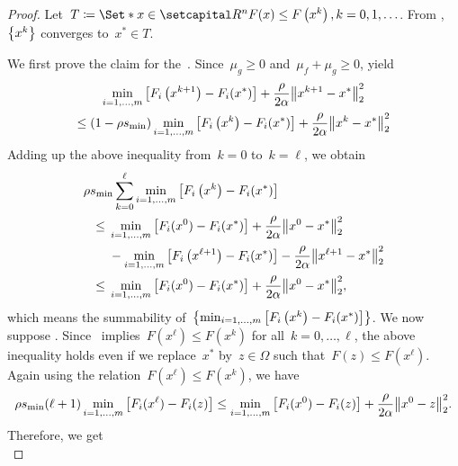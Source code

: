 \documentclass[../../main]{subfiles}
\begin{document}
\begin{proof}
    Let~$T \coloneqq \Set*{x \in \setR^n}{F(x) \le F\left(x^k\right), k = 0, 1, \dots}$.
    From ,~$\set*{x^k}$ converges to~$x^* \in T$.

    We first prove the claim for the~.
    Since~$\mu_g \ge 0$ and~$\mu_f + \mu_g \ge 0$,  yield
    \begin{multline}
        \min_{i = 1, \dots, m} \left[F_i\left(x^{k + 1}\right) - F_i(x^*)\right] + \frac{\rho}{2 \alpha} \norm*{x^{k + 1} - x^*}_2^2 \\
        \le \left(1 - \rho s_{\min}\right) \min_{i = 1, \dots, m} \left[F_i\left(x^k\right) - F_i(x^*)\right] + \frac{\rho}{2 \alpha} \norm*{x^k - x^*}_2^2
    \end{multline}
    Adding up the above inequality from~$k = 0$ to~$k = \ell$, we obtain
    \begin{align}
        \MoveEqLeft \rho s_{\min} \sum_{k = 0}^{\ell} \min_{i = 1, \dots, m} \left[F_i\left(x^k\right) - F_i(x^*)\right] \\
        \le{}& \min_{i = 1, \dots, m} \left[F_i(x^0) - F_i(x^*)\right] + \frac{\rho}{2 \alpha} \norm*{x^0 - x^*}_2^2 \\
             &- \min_{i = 1, \dots, m} \left[F_i\left(x^{\ell + 1}\right) - F_i(x^*)\right] - \frac{\rho}{2 \alpha} \norm*{x^{\ell + 1} - x^*}_2^2 \\
        \le{}& \min_{i = 1, \dots, m} \left[F_i(x^0) - F_i(x^*)\right] + \frac{\rho}{2 \alpha} \norm*{x^0 - x^*}_2^2
    ,\end{align}
    which means the summability of~$\set*{\min_{i = 1, \dots, m} \left[F_i\left(x^k\right) - F_i(x^*)\right]}$.
    We now suppose .
    Since~ implies~$F\left(x^\ell\right) \le F\left(x^k\right)$ for all~$k = 0, \dots, \ell$, the above inequality holds even if we replace~$x^*$ by~$z \in \Omega$ such that~$F(z) \le F\left(x^\ell\right)$.
    Again using the relation~$F\left(x^\ell\right) \le F\left(x^k\right)$, we have
    \begin{multline}
        \rho s_{\min} (\ell + 1) \min_{i = 1, \dots, m} \left[ F_i(x^\ell) - F_i(z) \right] \le \min_{i = 1, \dots, m} \left[F_i(x^0) - F_i(z)\right] + \frac{\rho}{2 \alpha} \norm*{x^0 - z}_2^2
    .\end{multline}
    Therefore, we get
    \begin{equation}

\end{equation}
\end{proof}
\end{document}
